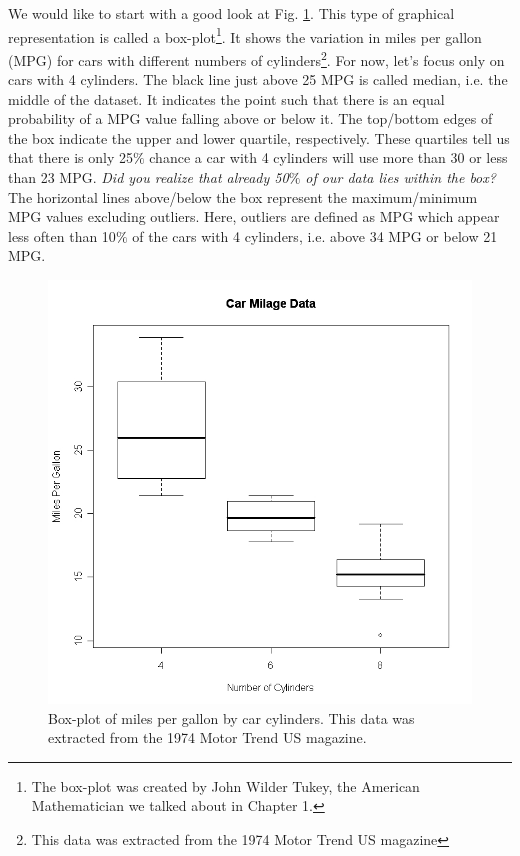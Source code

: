 \documentclass[10pt]{PhDthesisPSnPDF}%
\begin{document}
We would like to start with a good look at Fig. \ref{fig:boxplot}. This type of graphical representation is called a box-plot\footnote{The box-plot was created by John Wilder Tukey, the American Mathematician we talked about in Chapter 1.}. It shows the variation in miles per gallon (MPG) for cars with different numbers of cylinders\footnote{This data was extracted from the 1974 Motor Trend US magazine}. For now, let's focus only on cars with 4 cylinders. The black line just above 25 MPG is called median, i.e. the middle of the dataset. It indicates the point such that there is an equal probability of a MPG value falling above or below it. The top/bottom edges of the box indicate the upper and lower quartile, respectively. These quartiles tell us that there is only 25$\%$ chance a car with 4 cylinders will use more than 30 or less than 23 MPG. \textit{Did you realize that already 50$\%$ of our data lies within the box?} The horizontal lines above/below the box represent the maximum/minimum MPG values excluding outliers. Here, outliers are defined as MPG which appear less often than 10$\%$ of the cars with 4 cylinders, i.e. above 34 MPG or below 21 MPG.

\begin{figure}[h]
	\begin{center}
			\includegraphics[scale=0.3]{milleagech2}
	\end{center}
	\caption{Box-plot of miles per gallon by car cylinders. This data was extracted from the 1974 Motor Trend US magazine.}
	\label{fig:boxplot}
\end{figure} 
\end{document}
